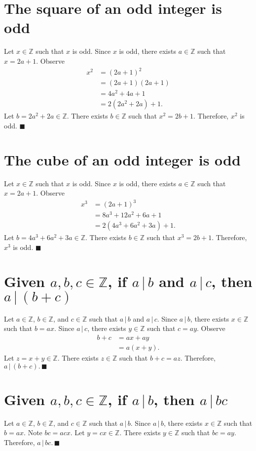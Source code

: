 \documentclass[12pt]{article}
\begin{document}
\section{The square of an odd integer is odd}
Let $x\in\mathbb{Z}$ such that $x$ is odd. Since $x$ is odd, there exists $a\in\mathbb{Z}$ such that $x=2a+1$. Observe
\begin{align*}
x^2
&=(2a+1)^2\\
&=(2a+1)(2a+1)\\
&=4a^2+4a+1\\
&=2(2a^2+2a)+1.
\end{align*}
Let $b=2a^2+2a\in\mathbb{Z}$. There exists $b\in\mathbb{Z}$ such that $x^2=2b+1$. Therefore, $x^2$ is odd. $\blacksquare$
\section{The cube of an odd integer is odd}
Let $x\in\mathbb{Z}$ such that $x$ is odd. Since $x$ is odd, there exists $a\in\mathbb{Z}$ such that $x=2a+1$. Observe
\begin{align*}
x^3
&=(2a+1)^3\\
&=8a^3+12a^2+6a+1\\
&=2(4a^3+6a^2+3a)+1.
\end{align*}
Let $b=4a^3+6a^2+3a\in\mathbb{Z}$. There exists $b\in\mathbb{Z}$ such that $x^3=2b+1$. Therefore, $x^3$ is odd. $\blacksquare$
\section{Given $a,b,c\in\mathbb{Z}$, if $a\,|\,b$ and $a\,|\,c$, then $a\,|\,(b+c)$}
Let $a\in\mathbb{Z}$, $b\in\mathbb{Z}$, and $c\in\mathbb{Z}$ such that $a\,|\,b$ and $a\,|\,c$. Since $a\,|\,b$, there exists $x\in\mathbb{Z}$ such that $b=ax$. Since $a\,|\,c$, there exists $y\in\mathbb{Z}$ such that $c=ay$. Observe
\begin{align*}
b+c
&=ax+ay\\
&=a(x+y).
\end{align*}
Let $z=x+y\in\mathbb{Z}$. There exists $z\in\mathbb{Z}$ such that $b+c=az$. Therefore, $a\,|\,(b+c).\,\blacksquare$
\section{Given $a,b,c\in\mathbb{Z}$, if $a\,|\,b$, then $a\,|\,bc$}
Let $a\in\mathbb{Z}$, $b\in\mathbb{Z}$, and $c\in\mathbb{Z}$ such that $a\,|\,b$. Since $a\,|\,b$, there exists $x\in\mathbb{Z}$ such that $b=ax$. Note $bc=acx$. Let $y=cx\in\mathbb{Z}$. There exists $y\in\mathbb{Z}$ such that $bc=ay$. Therefore, $a\,|\,bc.\,\blacksquare$
\end{document}
